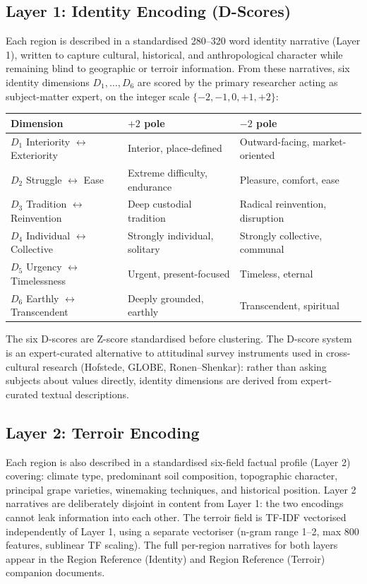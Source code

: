 \documentclass[11pt]{article}
\begin{document}
\subsection{Layer 1: Identity Encoding (D-Scores)}
Each region is described in a standardised 280--320 word identity narrative (Layer 1), written to capture cultural, historical, and anthropological character while remaining blind to geographic or terroir information. From these narratives, six identity dimensions $D_1, \ldots, D_6$ are scored by the primary researcher acting as subject-matter expert, on the integer scale $\{-2, -1, 0, +1, +2\}$:

\begin{center}
\begin{tabular}{@{}lll@{}}
\toprule
Dimension & $+2$ pole & $-2$ pole \\
\midrule
$D_1$ Interiority $\leftrightarrow$ Exteriority & Interior, place-defined           & Outward-facing, market-oriented \\
$D_2$ Struggle $\leftrightarrow$ Ease           & Extreme difficulty, endurance     & Pleasure, comfort, ease \\
$D_3$ Tradition $\leftrightarrow$ Reinvention   & Deep custodial tradition          & Radical reinvention, disruption \\
$D_4$ Individual $\leftrightarrow$ Collective   & Strongly individual, solitary     & Strongly collective, communal \\
$D_5$ Urgency $\leftrightarrow$ Timelessness    & Urgent, present-focused           & Timeless, eternal \\
$D_6$ Earthly $\leftrightarrow$ Transcendent    & Deeply grounded, earthly          & Transcendent, spiritual \\
\bottomrule
\end{tabular}
\end{center}

The six D-scores are Z-score standardised before clustering. The D-score system is an expert-curated alternative to attitudinal survey instruments used in cross-cultural research (Hofstede, GLOBE, Ronen--Shenkar): rather than asking subjects about values directly, identity dimensions are derived from expert-curated textual descriptions.

\subsection{Layer 2: Terroir Encoding}
Each region is also described in a standardised six-field factual profile (Layer 2) covering: climate type, predominant soil composition, topographic character, principal grape varieties, winemaking techniques, and historical position. Layer 2 narratives are deliberately disjoint in content from Layer 1: the two encodings cannot leak information into each other. The terroir field is TF-IDF vectorised independently of Layer 1, using a separate vectoriser (n-gram range 1--2, max 800 features, sublinear TF scaling). The full per-region narratives for both layers appear in the Region Reference (Identity) and Region Reference (Terroir) companion documents.
\end{document}
